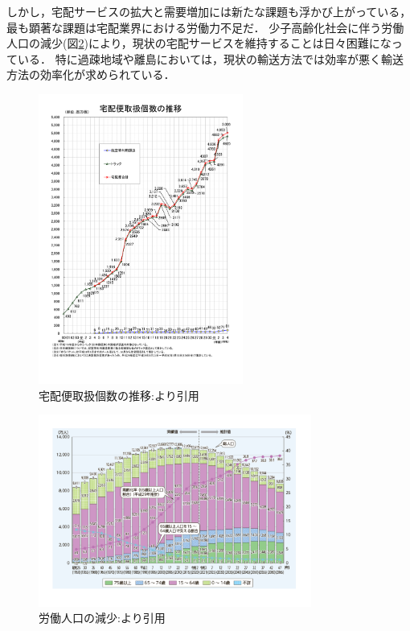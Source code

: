 \documentclass[a4paper, titlepage]{jsarticle}
\begin{document}
しかし，宅配サービスの拡大と需要増加には新たな課題も浮かび上がっている，最も顕著な課題は宅配業界における労働力不足だ．
少子高齢化社会に伴う労働人口の減少(図\ref{fig:working_population})により，現状の宅配サービスを維持することは日々困難になっている．
特に過疎地域や離島においては，現状の輸送方法では効率が悪く輸送方法の効率化が求められている．
\begin{figure}[H]
    \centering
    \includegraphics[width=0.6\textwidth]{./home_delivery.pdf}
    \caption{宅配便取扱個数の推移:\cite{home_delivery_2022}より引用}
    \label{fig:home_delivery}
\end{figure}
\begin{figure}[H]
    \centering
    \includegraphics[width=0.8\textwidth]{./working_population.pdf}
    \caption{労働人口の減少:\cite{working_population_2022}より引用}
    \label{fig:working_population}
\end{figure}
\end{document}
